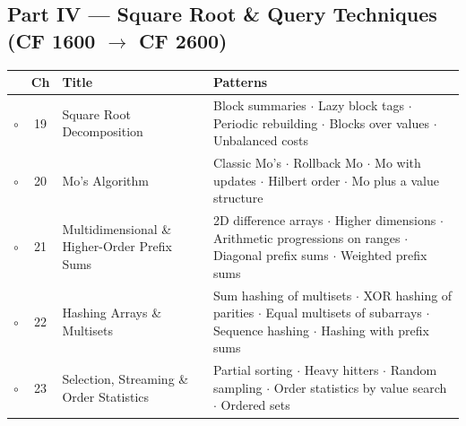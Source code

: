 \subsection*{Part IV --- Square Root \& Query Techniques (CF 1600 $\to$ CF 2600)}
\begin{tabularx}{\linewidth}{@{}c c >{\raggedright\arraybackslash}p{3.6cm} X@{}}
\toprule
& \textbf{Ch} & \textbf{Title} & \textbf{Patterns} \\
\midrule
$\circ$ & 19 & Square Root Decomposition & Block summaries $\cdot$ Lazy block tags $\cdot$ Periodic rebuilding $\cdot$ Blocks over values $\cdot$ Unbalanced costs \\
$\circ$ & 20 & Mo's Algorithm & Classic Mo's $\cdot$ Rollback Mo $\cdot$ Mo with updates $\cdot$ Hilbert order $\cdot$ Mo plus a value structure \\
$\circ$ & 21 & Multidimensional \& Higher-Order Prefix Sums & 2D difference arrays $\cdot$ Higher dimensions $\cdot$ Arithmetic progressions on ranges $\cdot$ Diagonal prefix sums $\cdot$ Weighted prefix sums \\
$\circ$ & 22 & Hashing Arrays \& Multisets & Sum hashing of multisets $\cdot$ XOR hashing of parities $\cdot$ Equal multisets of subarrays $\cdot$ Sequence hashing $\cdot$ Hashing with prefix sums \\
$\circ$ & 23 & Selection, Streaming \& Order Statistics & Partial sorting $\cdot$ Heavy hitters $\cdot$ Random sampling $\cdot$ Order statistics by value search $\cdot$ Ordered sets \\
\bottomrule
\end{tabularx}

